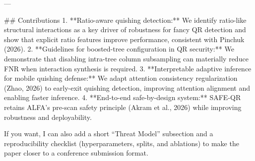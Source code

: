---

## Contributions  
1. **Ratio-aware quishing detection:** We identify ratio-like structural interactions as a key driver of robustness for fancy QR detection and show that explicit ratio features improve performance, consistent with Pinchuk (2026).  
2. **Guidelines for boosted-tree configuration in QR security:** We demonstrate that disabling intra-tree column subsampling can materially reduce FNR when interaction synthesis is required.  
3. **Interpretable adaptive inference for mobile quishing defense:** We adapt attention consistency regularization (Zhao, 2026) to early-exit quishing detection, improving attention alignment and enabling faster inference.  
4. **End-to-end safe-by-design system:** SAFE-QR retains ALFA’s pre-scan safety principle (Akram et al., 2026) while improving robustness and deployability.

If you want, I can also add a short “Threat Model” subsection and a reproducibility checklist (hyperparameters, splits, and ablations) to make the paper closer to a conference submission format.